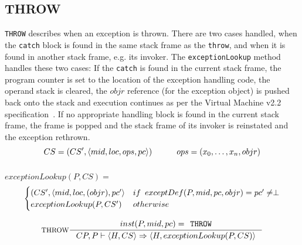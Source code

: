 \subsection{THROW}
\texttt{THROW} describes when an exception is thrown. There are two cases handled, when the \texttt{catch} block is found in the same stack frame as the \texttt{throw}, and when it is found in another stack frame, e.g. its invoker. The \texttt{exceptionLookup} method handles these two cases: If the \texttt{catch} is found in the current stack frame, the program counter is set to the location of the exception handling code, the operand stack is cleared, the $objr$ reference (for the exception object) is pushed back onto the stack and execution continues as per the \jc Virtual Machine v2.2 specification~\cite[JcvmSpec p. 151]{java_card_spec}. If no appropriate handling block is found in the current stack frame, the frame is popped and the stack frame of its invoker is reinstated and the exception rethrown.\\
$$CS = (CS', \langle mid, loc, ops, pc \rangle) \hspace{30px} ops = (x_0, \ldots, x_n, objr)$$\vspace{-10px} \\
$exceptionLookup(P, CS) = $ \vspace{-10px} \\
\[
\begin{cases}
  (CS', \langle mid, loc, (objr), pc' \rangle  & if \hspace{5px} exceptDef(P, mid, pc, objr) = pc' \neq \perp\\
  exceptionLookup(P, CS') & otherwise
\end{cases}
\]

$$\inference[THROW]{
inst(P,mid,pc) = \texttt{THROW} }
{CP, P \vdash \langle H, CS \rangle \Rightarrow \langle H, exceptionLookup(P,CS)\rangle}$$
